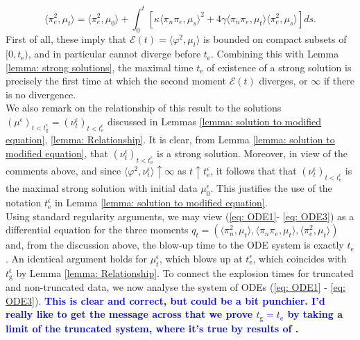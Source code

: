 \documentclass[11pt, notitlepage]{article}
\newcommand\dhcomment[1]{\textcolor{blue}{\textbf{#1}}}
\begin{document}
\begin{equation} \label{eq: ODE3}
    \langle \pi_e^2, \mu_t\rangle =
    \langle \pi_e^2, \mu_0\rangle + \int_0^t \left[\kappa\langle \pi_n\pi_e, \mu_s\rangle^2+4\gamma\langle \pi_n\pi_e, \mu_t\rangle\langle\pi_e^2, \mu_s \rangle \right] ds.
\end{equation} First of all, these imply that $\mathcal{E}(t)=\langle \varphi^2, \mu_t\rangle$ is bounded on compact subsets of $[0, t_\mathrm{e})$, and in particular cannot diverge before $t_\mathrm{e}$. Combining this with Lemma \ref{lemma: strong solutions}, the maximal time $t_\mathrm{e}$ of existence of a strong solution is precisely the first time at which the second moment $\mathcal{E}(t)$ diverges, or $\infty$ if there is no divergence. \medskip \\ We also remark on the relationship of this result to the solutions $(\mu^\epsilon)_{t<t_\mathrm{g}^\epsilon}=(\nu^\epsilon_t)_{t<t_\mathrm{e}^\epsilon}$ discussed in Lemmas \ref{lemma: solution to modified equation}, \ref{lemma: Relationship}. It is clear, from Lemma \ref{lemma: solution to modified equation}, that $(\nu^\epsilon_t)_{t<t_\mathrm{e}^\epsilon}$ is a strong solution. Moreover, in view of the comments above, and since $\langle \varphi^2, \nu^\epsilon_t\rangle \uparrow \infty$ as $t\uparrow t_\mathrm{e}^\epsilon$, it follows that that $(\nu^{\epsilon}_t)_{t<t_\mathrm{e}^\epsilon}$ is the maximal strong solution with initial data $\mu^\epsilon_0.$ This justifies the use of the notation $t^\epsilon_\mathrm{e}$ in Lemma \ref{lemma: solution to modified equation}. \medskip \\  Using standard regularity arguments, we may view (\ref{eq: ODE1}- \ref{eq: ODE3}) as a differential equation for the three moments $q_t=(\langle \pi_n^2, \mu_t\rangle, \langle \pi_n \pi_e, \mu_t\rangle, \langle \pi_e^2, \mu_t\rangle)$ and, from the discussion above, the blow-up time to the ODE system is exactly $t_\mathrm{e}$. An identical argument holds for $\mu^\epsilon_t$, which blows up at $t^\epsilon_\mathrm{e}$, which coincides with  $t^\epsilon_\mathrm{g}$ by Lemma \ref{lemma: Relationship}. To connect the explosion times for truncated and non-truncated data, we now analyse the system of ODEs (\ref{eq: ODE1} - \ref{eq: ODE3}). \dhcomment{This is clear and correct, but could be a bit punchier. I'd really like to get the message across that we prove $t_\mathrm{g}=t_\mathrm{e}$ by taking a limit of the truncated system, where it's true by results of \cite{N00}.}
\end{document}
